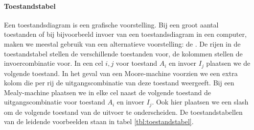 \begin{table}[hbt]
\centering
{}
\caption{Toestandstabellen van de leidende voorbeelden.}
\end{table}
\paragraph{Toestandstabel}Een toestandsdiagram is een grafische voorstelling. Bij een groot aantal toestanden of bij bijvoorbeeld invoer van een toestandsdiagram in een computer, maken we meestal gebruik van een alternatieve voorstelling: de . De rijen in de toestandstabel stellen de verschillende toestanden voor, de kolommen stellen de invoercombinatie voor. In een cel $i,j$ voor toestand $A_i$ en invoer $I_j$ plaatsen we de volgende toestand. In het geval van een Moore-machine voorzien we een extra kolom die per rij de uitgangscombinatie van deze toestand weergeeft. Bij een Mealy-machine plaatsen we in elke cel naast de volgende toestand de uitgangscombinatie voor toestand $A_i$ en invoer $I_j$. Ook hier plaatsen we een slash om de volgende toestand van de uitvoer te onderscheiden. De toestandstabellen van de leidende voorbeelden staan in tabel \ref{tbl:toestandstabel}.
